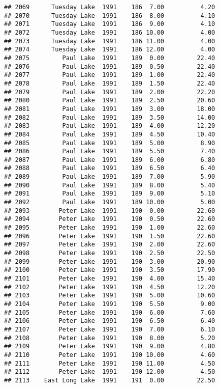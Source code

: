 \documentclass[
]{article}
\begin{document}
\begin{verbatim}
## 2069      Tuesday Lake  1991    186  7.00          4.20
## 2070      Tuesday Lake  1991    186  8.00          4.10
## 2071      Tuesday Lake  1991    186  9.00          4.10
## 2072      Tuesday Lake  1991    186 10.00          4.00
## 2073      Tuesday Lake  1991    186 11.00          4.00
## 2074      Tuesday Lake  1991    186 12.00          4.00
## 2075         Paul Lake  1991    189  0.00         22.40
## 2076         Paul Lake  1991    189  0.50         22.40
## 2077         Paul Lake  1991    189  1.00         22.40
## 2078         Paul Lake  1991    189  1.50         22.40
## 2079         Paul Lake  1991    189  2.00         22.20
## 2080         Paul Lake  1991    189  2.50         20.60
## 2081         Paul Lake  1991    189  3.00         18.00
## 2082         Paul Lake  1991    189  3.50         14.00
## 2083         Paul Lake  1991    189  4.00         12.20
## 2084         Paul Lake  1991    189  4.50         10.40
## 2085         Paul Lake  1991    189  5.00          8.90
## 2086         Paul Lake  1991    189  5.50          7.40
## 2087         Paul Lake  1991    189  6.00          6.80
## 2088         Paul Lake  1991    189  6.50          6.40
## 2089         Paul Lake  1991    189  7.00          5.90
## 2090         Paul Lake  1991    189  8.00          5.40
## 2091         Paul Lake  1991    189  9.00          5.10
## 2092         Paul Lake  1991    189 10.00          5.00
## 2093        Peter Lake  1991    190  0.00         22.60
## 2094        Peter Lake  1991    190  0.50         22.60
## 2095        Peter Lake  1991    190  1.00         22.60
## 2096        Peter Lake  1991    190  1.50         22.60
## 2097        Peter Lake  1991    190  2.00         22.60
## 2098        Peter Lake  1991    190  2.50         22.50
## 2099        Peter Lake  1991    190  3.00         20.90
## 2100        Peter Lake  1991    190  3.50         17.90
## 2101        Peter Lake  1991    190  4.00         15.40
## 2102        Peter Lake  1991    190  4.50         12.20
## 2103        Peter Lake  1991    190  5.00         10.60
## 2104        Peter Lake  1991    190  5.50          9.00
## 2105        Peter Lake  1991    190  6.00          7.60
## 2106        Peter Lake  1991    190  6.50          6.40
## 2107        Peter Lake  1991    190  7.00          6.10
## 2108        Peter Lake  1991    190  8.00          5.20
## 2109        Peter Lake  1991    190  9.00          4.80
## 2110        Peter Lake  1991    190 10.00          4.60
## 2111        Peter Lake  1991    190 11.00          4.50
## 2112        Peter Lake  1991    190 12.00          4.50
## 2113    East Long Lake  1991    191  0.00         22.50

\end{verbatim}
\end{document}
